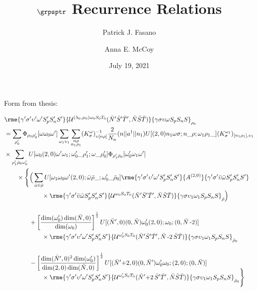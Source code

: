 \documentclass[%
  aps,%
  prc,%
  showpacs,%
  superscriptaddress,%
  onecolumn,%
  notitlepage,%
  11pt,%
  floatfix,%
  amsmath,%
  amssymb,%
]{revtex4-2}
\newcommand{\negative}{\,\text{-}}
\newcommand{\plus}{\text{+}}
\newcommand{\tquad}{\qquad\qquad\qquad}
\begin{document}
\title{$\grpsptr$ Recurrence Relations}

\author{Patrick J. Fasano}

\author{Anna E. McCoy}

\date{July 19, 2021}

\maketitle

Form from thesis:

\begin{align*}
  &\rme{\gamma'\sigma'\upsilon'\omega'S_p'S_n'S'}{\mathcal{U}^{(\lambda_0,\mu_0)\omega_0S_0T_0}(\bar{N}'\bar{S}'\bar{T}',\bar{N}\bar{S}\bar{T})}{\gamma\sigma\upsilon\omega S_pS_nS}_{\rho_0}\\
  &=\sum_{\rho_0'}\Phi_{\rho_0\rho_0'}[\omega\omega_0\omega']\sum_{\omega_1\upsilon_1}
  \sum_{\substack{n\rho\\n_1\rho_1}}(K_\sigma^\omega)_{\upsilon[n\rho]}^{-1}\frac{2}{N_n}(n||a^\dagger||n_1)U[(2,0)n_1\omega\sigma;n\_\rho;\omega_1\rho_1\_](K_\sigma^{\omega_1})_{[n_1\rho_1],\upsilon_1} \\
  &\times\sum_{\rho_1'\bar{\rho}_0\omega_0'}U[\omega_0(2,0)\omega'\omega_1;\omega_0'\_\rho_1';\omega\_\rho_0']\Phi_{\rho_1'\bar{\rho}_0}[\omega_0'\omega_1\omega']\\
  &\qquad\times\Bigg\{\Big(\sum_{\bar{\omega}\bar{\upsilon}\bar{\rho}}U[\omega_1\omega_0\omega'(2,0);\bar{\omega}\bar{\rho}\_;\omega_0'\_\bar{\rho}_0]
  \rme{\gamma'\sigma'\upsilon'\omega'S_p'S_n'S'}{A^{(2,0)}}{\gamma'\sigma'\bar{\upsilon}\bar{\omega}S_p'S_n'S'}\\
  &\tquad\times\rme{\gamma'\sigma'\bar{\upsilon}\bar{\omega}S_p'S_n'S'}{\mathcal{U}^{\omega_0S_0T_0}(\bar{N}'\bar{S}'\bar{T}',\bar{N}\bar{S}\bar{T})}{\gamma\sigma\upsilon_1\omega_1S_pS_nS}_{\bar{\rho}}\Big)\\[3ex]
  &\qquad\qquad+\left[\frac{\dim(\omega_0')\dim(\bar{N},0)}{\dim(\omega_0)}\right]^{\frac12}U[(\bar{N}',0)(0,\bar{N})\omega_0'(2,0);\omega_0;(0,\bar{N}\negative2)]\\
  &\tquad\times\rme{\gamma'\sigma'\upsilon'\omega'S_p'S_n'S'}{\mathcal{U}^{\omega_0'S_0T_0}(\bar{N}'\bar{S}'\bar{T}',\bar{N}\negative2\,\bar{S}\bar{T})}{\gamma\sigma\upsilon_1\omega_1S_pS_nS}_{\bar{\rho}_0}\\[3ex]
  &\qquad\qquad-\left[\frac{\dim(\bar{N}',0)^2\dim(\omega_0')}{\dim(2,0)\dim(\bar{N},0)}\right]^{\frac12}U[(\bar{N}'\plus2,0)(0,\bar{N}')\omega_0'\omega_0;(2,0);(0,\bar{N})]\\[-2ex]
  &\tquad\times\rme{\gamma'\sigma'\upsilon'\omega'S_p'S_n'S'}{\mathcal{U}^{\omega_0'S_0T_0}(\bar{N}'\plus2\,\bar{S}'\bar{T}',\bar{N}\bar{S}\bar{T})}{\gamma\sigma\upsilon_1\omega_1S_pS_nS}_{\bar{\rho}_0}\Bigg\}
\end{align*}
\end{document}

